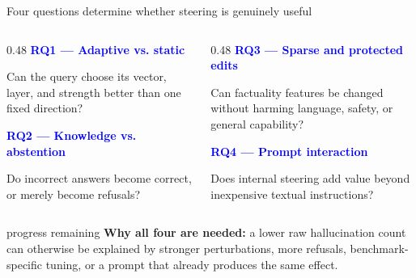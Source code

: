 \documentclass[aspectratio=169,11pt]{beamer}
\begin{document}
\begin{frame}{Four questions determine whether steering is genuinely useful}
  \small
  \begin{columns}[T,onlytextwidth]
    \begin{column}{0.48\textwidth}
      \textcolor{Blue}{\bfseries RQ1 --- Adaptive vs. static}\par
      Can the query choose its vector, layer, and strength better than one fixed direction?\par\vspace{0.35cm}
      \textcolor{Blue}{\bfseries RQ2 --- Knowledge vs. abstention}\par
      Do incorrect answers become correct, or merely become refusals?
    \end{column}
    \begin{column}{0.48\textwidth}
      \textcolor{Blue}{\bfseries RQ3 --- Sparse and protected edits}\par
      Can factuality features be changed without harming language, safety, or general capability?\par\vspace{0.35cm}
      \textcolor{Blue}{\bfseries RQ4 --- Prompt interaction}\par
      Does internal steering add value beyond inexpensive textual instructions?
    \end{column}
  \end{columns}
  \vspace{0.35cm}
  \begin{beamercolorbox}[rounded=true,sep=0.45em]{progress remaining}
    \textbf{Why all four are needed:} a lower raw hallucination count can otherwise be explained by stronger perturbations, more refusals, benchmark-specific tuning, or a prompt that already produces the same effect.
  \end{beamercolorbox}
\end{frame}
\end{document}

